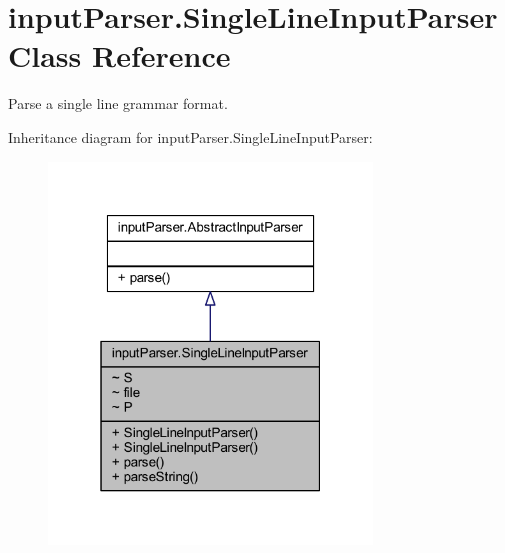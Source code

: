 \hypertarget{classinput_parser_1_1_single_line_input_parser}{\section{input\-Parser.\-Single\-Line\-Input\-Parser Class Reference}
\label{classinput_parser_1_1_single_line_input_parser}
}


Parse a single line grammar format.  




Inheritance diagram for input\-Parser.\-Single\-Line\-Input\-Parser\-:\nopagebreak
\begin{figure}[H]
\begin{center}
\leavevmode
\includegraphics[width=244pt]{classinput_parser_1_1_single_line_input_parser__inherit__graph}
\end{center}
\end{figure}


